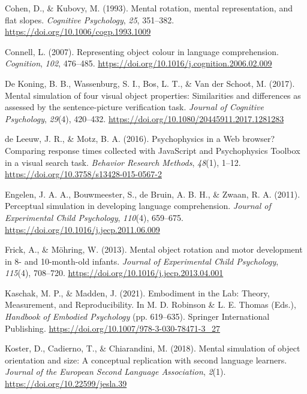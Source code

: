 \documentclass[
  man]{apa7}
\newlength{\cslhangindent}
\newlength{\cslentryspacingunit} %
\newenvironment{CSLReferences}[2] %
 {%
  \setlength{\parindent}{0pt}
  \ifodd #1
  \let\oldpar\par
  \def\par{\hangindent=\cslhangindent\oldpar}
  \fi
  \setlength{\parskip}{#2\cslentryspacingunit}
 }%
 {}
\begin{document}
\begin{CSLReferences}{1}{0}
\leavevmode{}%
Cohen, D., \& Kubovy, M. (1993). Mental rotation, mental representation, and flat slopes. \emph{Cognitive Psychology}, \emph{25}, 351--382. \url{https://doi.org/10.1006/cogp.1993.1009}

\leavevmode{}%
Connell, L. (2007). Representing object colour in language comprehension. \emph{Cognition}, \emph{102}, 476--485. \url{https://doi.org/10.1016/j.cognition.2006.02.009}

\leavevmode{}%
De Koning, B. B., Wassenburg, S. I., Bos, L. T., \& Van der Schoot, M. (2017). Mental simulation of four visual object properties: Similarities and differences as assessed by the sentence-picture verification task. \emph{Journal of Cognitive Psychology}, \emph{29}(4), 420--432. \url{https://doi.org/10.1080/20445911.2017.1281283}

\leavevmode{}%
de Leeuw, J. R., \& Motz, B. A. (2016). Psychophysics in a {Web} browser? {Comparing} response times collected with {JavaScript} and {Psychophysics Toolbox} in a visual search task. \emph{Behavior Research Methods}, \emph{48}(1), 1--12. \url{https://doi.org/10.3758/s13428-015-0567-2}

\leavevmode{}%
Engelen, J. A. A., Bouwmeester, S., de Bruin, A. B. H., \& Zwaan, R. A. (2011). Perceptual simulation in developing language comprehension. \emph{Journal of Experimental Child Psychology}, \emph{110}(4), 659--675. \url{https://doi.org/10.1016/j.jecp.2011.06.009}

\leavevmode{}%
Frick, A., \& Möhring, W. (2013). Mental object rotation and motor development in 8- and 10-month-old infants. \emph{Journal of Experimental Child Psychology}, \emph{115}(4), 708--720. \url{https://doi.org/10.1016/j.jecp.2013.04.001}

\leavevmode{}%
Kaschak, M. P., \& Madden, J. (2021). Embodiment in the {Lab}: {Theory}, {Measurement}, and {Reproducibility}. In M. D. Robinson \& L. E. Thomas (Eds.), \emph{Handbook of {Embodied Psychology}} (pp. 619--635). {Springer International Publishing}. \url{https://doi.org/10.1007/978-3-030-78471-3_27}

\leavevmode{}%
Koster, D., Cadierno, T., \& Chiarandini, M. (2018). Mental simulation of object orientation and size: {A} conceptual replication with second language learners. \emph{Journal of the European Second Language Association}, \emph{2}(1). \url{https://doi.org/10.22599/jesla.39}


\end{CSLReferences}
\end{document}
